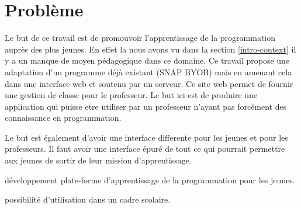 \section{Problème}
\label{into-problem}
Le but de ce travail est de promouvoir l'apprentissage de la programmation auprès des plus jeunes. En effet la nous avons vu dans la section \ref{intro-context} il y a un manque de moyen pédagogique dans ce domaine. Ce travail propose une adaptation d'un programme déjà existant (SNAP BYOB) mais en amenant cela dans une interface web et soutenu par un serveur. Ce site web permet de fournir une gestion de classe pour le professeur. Le but ici est de produire une application qui puisse etre utiliser par un professeur n'ayant pas forcément des connaissance en programmation.

Le but est également d'avoir une interface differente pour les jeunes et pour les professeurs. Il faut avoir une interface épuré de tout ce qui pourrait permettre aux jeunes de sortir de leur mission d'apprentissage.






développement plate-forme d'apprentissage de la programmation pour les jeunes.

possibilité d'utilisation dans un cadre scolaire.
